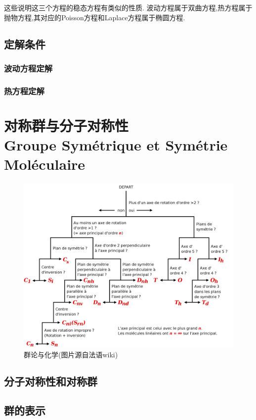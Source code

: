 \documentclass[12pt, a4paper, oneside]{ctexbook}
\begin{document}
  这些说明这三个方程的稳态方程有类似的性质.
  波动方程属于双曲方程,热方程属于抛物方程,其对应的Poisson方程和Laplace方程属于椭圆方程.
  \section{定解条件}
  \subsection{波动方程定解}
  \subsection{热方程定解}




  \chapter{对称群与分子对称性\\ Groupe Symétrique et Symétrie Moléculaire}
  \begin{figure}[H]%
    \centering
    \includegraphics[scale=0.15]{groupe_chimie.png}
    \caption{群论与化学(图片源自法语wiki)}
    \label{myref:groupechimie}
  \end{figure}
  \section{分子对称性和对称群}
  \section{群的表示}
\end{document}
